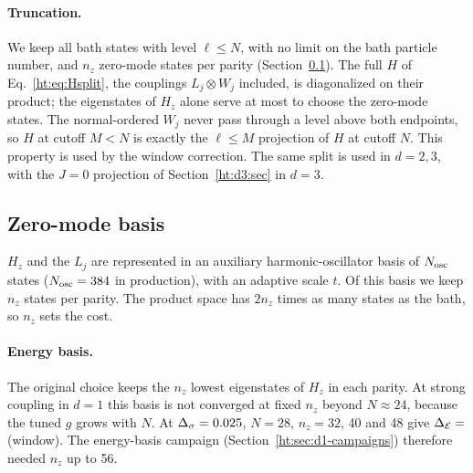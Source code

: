 \paragraph{Truncation.} We keep all bath states with level $\ell\le N$, with no limit on the bath particle number, and
$n_z$ zero-mode states per parity (Section~\ref{ht:sec:zerobasis}). The full $H$ of Eq.~\eqref{ht:eq:Hsplit}, the couplings
$L_j\otimes W_j$ included, is diagonalized on their product; the eigenstates of $H_z$ alone serve at most to choose
the zero-mode states. The normal-ordered $W_j$ never pass through a level above both endpoints, so $H$ at cutoff $M<N$ is exactly the
$\ell\le M$ projection of $H$ at cutoff $N$. This property is used by the window correction. The same split is used
in $d=2,3$, with the $J=0$ projection of Section~\ref{ht:d3:sec} in $d=3$.

\subsection{Zero-mode basis}\label{ht:sec:zerobasis}
$H_z$ and the $L_j$ are represented in an auxiliary harmonic-oscillator basis of $N_{\rm osc}$ states
($N_{\rm osc}=384$ in production), with an adaptive scale $t$. Of this basis we keep $n_z$ states per parity. The product space has $2n_z$ times as many
states as the bath, so $n_z$ sets the cost.

\paragraph{Energy basis.} The original choice keeps the $n_z$ lowest eigenstates of $H_z$ in each parity. At strong
coupling in $d=1$ this basis is not converged at fixed $n_z$ beyond $N\approx24$, because the tuned $g$ grows with
$N$. At $\Delta_\sigma=0.025$, $N=28$, $n_z=32$, 40 and 48 give $\DE=\HTq{B1}$ (window). The energy-basis campaign
 (Section~\ref{ht:sec:d1-campaigns}) therefore needed $n_z$ up to 56.

